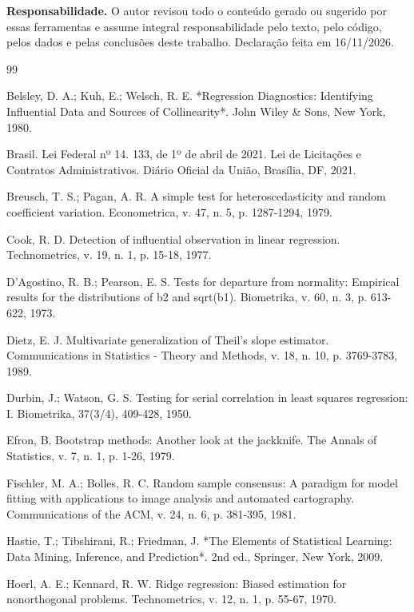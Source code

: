 \documentclass[12pt,a4paper]{article}
\begin{document}
\textbf{Responsabilidade.} O autor revisou todo o conteúdo gerado ou sugerido por essas ferramentas e assume integral responsabilidade pelo texto, pelo código, pelos dados e pelas conclusões deste trabalho. Declaração feita em 16/11/2026.


\begin{thebibliography}{99}

 Belsley, D. A.; Kuh, E.; Welsch, R. E. *Regression Diagnostics: Identifying Influential Data and Sources of Collinearity*. John Wiley \& Sons, New York, 1980.

 Brasil. Lei Federal nº 14. 133, de 1º de abril de 2021. Lei de Licitações e Contratos Administrativos. Diário Oficial da União, Brasília, DF, 2021.

 Breusch, T. S.; Pagan, A. R. A simple test for heteroscedasticity and random coefficient variation. Econometrica, v. 47, n. 5, p. 1287-1294, 1979.

 Cook, R. D. Detection of influential observation in linear regression. Technometrics, v. 19, n. 1, p. 15-18, 1977.

 D'Agostino, R. B.; Pearson, E. S. Tests for departure from normality: Empirical results for the distributions of b2 and sqrt(b1). Biometrika, v. 60, n. 3, p. 613-622, 1973.

 Dietz, E. J. Multivariate generalization of Theil's slope estimator. Communications in Statistics - Theory and Methods, v. 18, n. 10, p. 3769-3783, 1989.

 Durbin, J.; Watson, G. S. Testing for serial correlation in least squares regression: I. Biometrika, 37(3/4), 409-428, 1950.

 Efron, B. Bootstrap methods: Another look at the jackknife. The Annals of Statistics, v. 7, n. 1, p. 1-26, 1979.

 Fischler, M. A.; Bolles, R. C. Random sample consensus: A paradigm for model fitting with applications to image analysis and automated cartography. Communications of the ACM, v. 24, n. 6, p. 381-395, 1981.

 Hastie, T.; Tibshirani, R.; Friedman, J. *The Elements of Statistical Learning: Data Mining, Inference, and Prediction*. 2nd ed., Springer, New York, 2009.

 Hoerl, A. E.; Kennard, R. W. Ridge regression: Biased estimation for nonorthogonal problems. Technometrics, v. 12, n. 1, p. 55-67, 1970.


\end{thebibliography}
\end{document}
